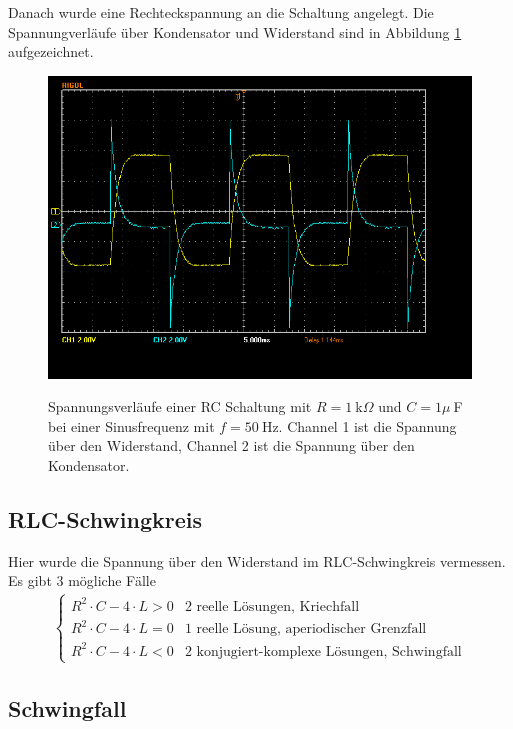 \documentclass{article}
\begin{document}
Danach wurde eine Rechteckspannung an die Schaltung angelegt. Die Spannungverläufe über Kondensator und Widerstand sind in Abbildung \ref{fig:schaltung1_rechteck} aufgezeichnet.


\begin{figure}[H]
\caption{Spannungsverläufe einer RC Schaltung mit $R=1~$k$\Omega$ und $C=1\mu~$F bei einer Sinusfrequenz mit $f=50~$Hz. Channel 1 ist die Spannung über den Widerstand, Channel 2 ist die Spannung über den Kondensator.}
\label{fig:schaltung1_rechteck}
{\centering
\includegraphics[scale=0.4]{winkler/Schaltung_1_Rechteck.png}}
\end{figure}




\subsection{RLC-Schwingkreis}


Hier wurde die Spannung über den Widerstand im RLC-Schwingkreis vermessen. Es gibt 3 mögliche Fälle
\begin{align*}
\begin{cases}
R^2\cdot C - 4\cdot L > 0 & 2 \text{ reelle Lösungen, Kriechfall} \\
R^2\cdot C - 4\cdot L = 0 & 1 \text{ reelle Lösung, aperiodischer Grenzfall} \\
R^2\cdot C - 4\cdot L < 0 & 2 \text{ konjugiert-komplexe Lösungen, Schwingfall}
\end{cases}
\end{align*}

\subsection{Schwingfall}
\end{document}
